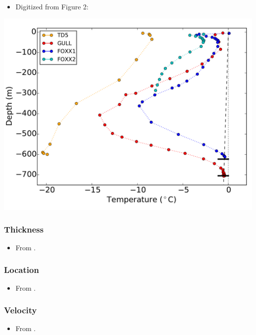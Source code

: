 \documentclass[article,a4paper,times,11pt,twoside]{article}
\begin{document}
\begin{itemize}
\item Digitized from \textcite{luthi_2015} Figure 2:
\end{itemize}

\begin{center}
\includegraphics[width=.9\linewidth]{foxx1/luthi_2015_fig2_all.png}
\end{center}

\subsubsection{Thickness}
\label{sec:org06a54d7}

\begin{itemize}
\item From \textcite{ryser_2014_caterpillar}.
\end{itemize}

\subsubsection{Location}
\label{sec:org172fe35}

\begin{itemize}
\item From \textcite{ryser_2014_caterpillar}.
\end{itemize}

\subsubsection{Velocity}
\label{sec:orgd70c78b}

\begin{itemize}
\item From \textcite{ryser_2014_caterpillar}.
\end{itemize}
\end{document}
